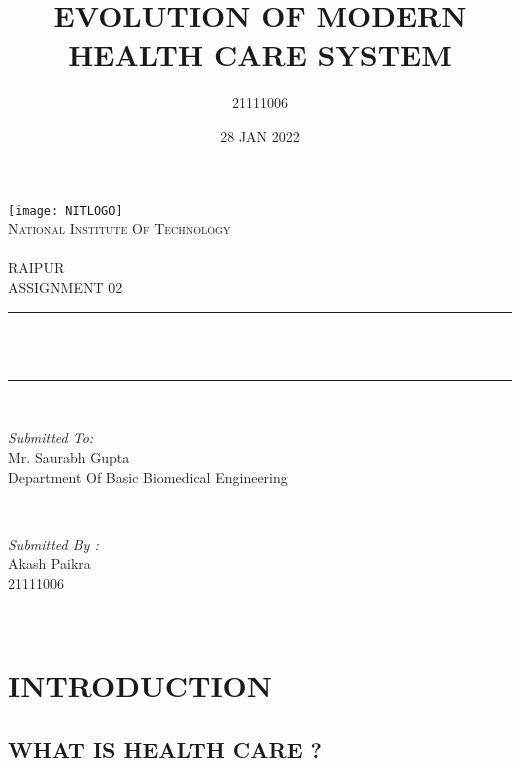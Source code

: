 \documentclass[12pt]{article}
\title{EVOLUTION OF MODERN HEALTH CARE SYSTEM}\newline \\\\\\
\author{21111006}
\date{28 JAN 2022}
\makeatletter
\let\thetitle\@title
\makeatother
\begin{document}
\begin{titlepage}
	\centering
    \texttt{[image: NITLOGO]}\\[1.0 cm]	
    \textsc{\LARGE National Institute Of Technology \newline\\\\ RAIPUR}\\[2.0 CM]
    
	\textsc{\Large ASSIGNMENT 02}\\[0.5 cm]				%
	\rule{\linewidth}{0.4 mm} \\[0.4 cm]
	{ \huge \bfseries \thetitle}\\
	\rule{\linewidth}{0.4 mm} \\[1.5 cm]
	
	\begin{minipage}{0.6\textwidth}
		\begin{flushleft} \large
			\emph{Submitted To:}\\
			Mr. Saurabh Gupta\\
            Department Of Basic Biomedical Engineering\\
			\end{flushleft}
			\end{minipage}~
			\begin{minipage}{0.4\textwidth}
            
			\begin{flushright} \large
			\emph{Submitted By :}\\
			Akash Paikra\\
            21111006\\
		\end{flushright}
        
	\end{minipage}\\[2 cm]
\end{titlepage}

\tableofcontents
\pagebreak







\section{INTRODUCTION}

\subsection{WHAT IS HEALTH CARE ?}
\end{document}
